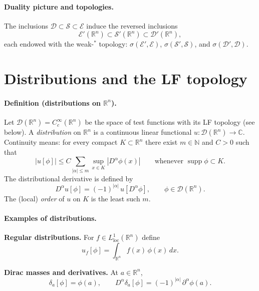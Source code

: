 \documentclass[12pt,a4paper]{article}
\theoremstyle{plain}
\theoremstyle{definition}
\theoremstyle{remark}
\theoremstyle{remark}
\begin{document}
\bigskip

\paragraph{Duality picture and topologies.}
The inclusions $\mathcal D\subset\mathcal S\subset\mathcal E$ induce the reversed inclusions
\[
\mathcal E'(\mathbb R^n)\subset \mathcal S'(\mathbb R^n)\subset \mathcal D'(\mathbb R^n),
\]
each endowed with the weak-$^\ast$ topology:
$\sigma(\mathcal E',\mathcal E)$, $\sigma(\mathcal S',\mathcal S)$, and $\sigma(\mathcal D',\mathcal D)$.



\section*{Distributions and the LF topology}

\paragraph{Definition (distributions on $\mathbb R^n$).}
Let $\mathcal D(\mathbb R^n)=C_c^\infty(\mathbb R^n)$ be the space of test functions with its LF topology (see below).
A \emph{distribution} on $\mathbb R^n$ is a continuous linear functional $u:\mathcal D(\mathbb R^n)\to\mathbb C$.
Continuity means: for every compact $K\subset\mathbb R^n$ there exist $m\in\mathbb N$ and $C>0$ such that
\[
|u[\phi]|\le C \sum_{|\alpha|\le m}\sup_{x\in K}|D^\alpha\phi(x)|
\qquad\text{whenever }\operatorname{supp}\phi\subset K.
\]
The distributional derivative is defined by
\[
D^\alpha u[\phi]=(-1)^{|\alpha|}\,u[D^\alpha\phi],\qquad \phi\in\mathcal D(\mathbb R^n).
\]
The (local) \emph{order} of $u$ on $K$ is the least such $m$.

\bigskip

\paragraph{Examples of distributions.}

\bigskip

\textbf{Regular distributions.}
For $f\in L^1_{\mathrm{loc}}(\mathbb R^n)$ define
\[
u_f[\phi]=\int_{\mathbb R^n} f(x)\,\phi(x)\,dx .
\]

\medskip

\textbf{Dirac masses and derivatives.}
At $a\in\mathbb R^n$,
\[
\delta_a[\phi]=\phi(a), 
\qquad
D^\alpha\delta_a[\phi]=(-1)^{|\alpha|}\,\partial^\alpha\phi(a).
\]
\end{document}
